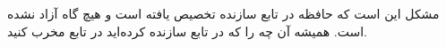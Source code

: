 \section{}
\paragraph{}\label{answer:32}
مشکل این است که حافظه در تابع سازنده تخصیص یافته است و هیچ گاه آزاد نشده است. همیشه آن چه را که در تابع سازنده  کرده‌اید در تابع مخرب  کنید.
